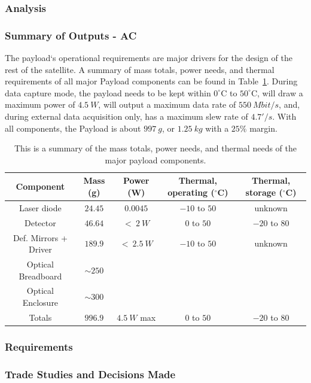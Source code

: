 \documentclass[12pt]{article}
\begin{document}
			\subsubsection{Analysis}

			\subsubsection{Summary of Outputs - AC}

The payload`s operational requirements are major drivers for the design of the rest of the satellite. A summary of mass totals, power needs, and thermal requirements of all major Payload components can be found in Table~\ref{fig:payload_summary_table}.  
During data capture mode, the payload needs to be kept within $0^\circ$C to $50^\circ$C, will draw a maximum power of $4.5\ W$, will output a maximum data rate of $550\ Mbit/s$, and, during external data acquisition only, has a maximum slew rate of $4.7'/s$. 
With all components, the Payload is about $997\ g$, or $1.25\ kg$ with a $25\%$ margin.  

\begin{table}
\caption{This is a summary of the mass totals, power needs, and thermal needs of the major payload components.}
\label{fig:payload_summary_table}
\begin{tabular}{|c||c|c|c|c|} \hline
	Component & Mass (g) & Power (W) & Thermal, operating ($^\circ$C) & Thermal, storage ($^\circ$C) \\ \hline \hline
Laser diode & $24.45$ & $0.0045$ & $-10$ to $50$ & unknown \\
Detector & $46.64$ & $<\ 2\ W$ & $0$ to $50$ & $-20$ to $80$ \\
Def. Mirrors + Driver & $189.9$ & $<\ 2.5\ W$ & $-10$ to $50$ & unknown \\
Optical Breadboard & $\sim 250$ & ~ & ~ & \\
Optical Enclosure & $\sim 300$ & ~ & ~ & \\ \hline \hline
Totals & $996.9$ & $4.5\ W$ max & $0$ to $50$ & $-20$ to $80$ \\ \hline
\end{tabular}
\end{table}


			\subsubsection{Requirements}
			\subsubsection{Trade Studies and Decisions Made}
\end{document}
